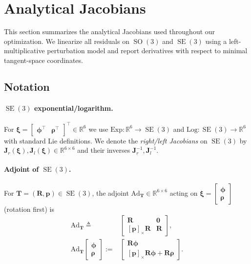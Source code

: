 \section{Analytical Jacobians}
\label{sec:maci2:jacobians}

This section summarizes the analytical Jacobians used throughout our optimization. We linearize all residuals on $\operatorname{SO}(3)$ and $\operatorname{SE}(3)$ using a left-multiplicative perturbation model and report derivatives with respect to minimal tangent-space coordinates.

\subsection{Notation}

\paragraph{$\operatorname{SE}(3)$ exponential/logarithm.}
For $\boldsymbol{\xi}=\begin{bmatrix}\boldsymbol{\phi}^\top & \boldsymbol{\rho}^\top\end{bmatrix}^\top\in\mathbb{R}^6$
we use $\text{Exp}:\mathbb{R}^6\!\to\!\operatorname{SE}(3)$ and $\text{Log}:\operatorname{SE}(3)\!\to\!\mathbb{R}^6$ with standard Lie definitions.
We denote the \emph{right/left Jacobians} on $\operatorname{SE}(3)$ by
$\mathbf{J}_r(\boldsymbol{\xi}),\mathbf{J}_l(\boldsymbol{\xi})\in\mathbb{R}^{6\times 6}$ and their inverses
$\mathbf{J}_r^{-1},\mathbf{J}_l^{-1}$.

\paragraph{Adjoint of $\operatorname{SE}(3)$.}
For $\mathbf{T}=(\mathbf{R},\mathbf{p})\in\operatorname{SE}(3)$, the adjoint $\mathrm{Ad}_{\mathbf{T}}\in\mathbb{R}^{6\times 6}$ acting on
$\boldsymbol{\xi}=\begin{bmatrix}\boldsymbol{\phi}\\\boldsymbol{\rho}\end{bmatrix}$ (rotation first) is
\begin{equation}
\begin{aligned}
\mathrm{Ad}_{\mathbf{T}} \triangleq {}&
\begin{bmatrix}
\mathbf{R} & \mathbf{0}\\
[\mathbf{p}]_\times \mathbf{R} & \mathbf{R}
\end{bmatrix},\\
\mathrm{Ad}_{\mathbf{T}}
\begin{bmatrix}\boldsymbol{\phi}\\\boldsymbol{\rho}\end{bmatrix}
:={}&
\begin{bmatrix}
\mathbf{R}\boldsymbol{\phi}\\
[\mathbf{p}]_\times \mathbf{R}\boldsymbol{\phi}+\mathbf{R}\boldsymbol{\rho}
\end{bmatrix}.
\end{aligned}
\end{equation}

